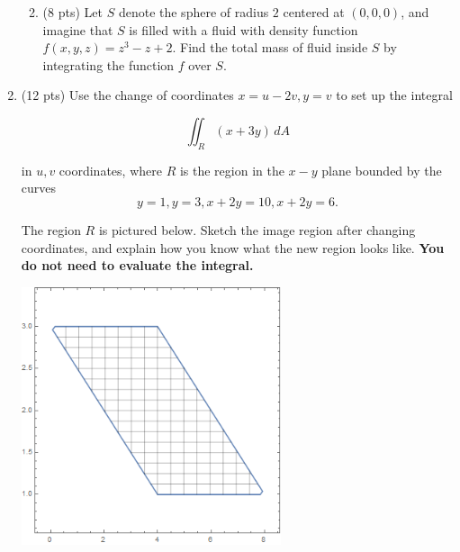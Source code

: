 \documentclass[12 pt]{report}
\begin{document}
\begin{enumerate}
\begin{enumerate}
\vfill

\item (8 pts) Let $S$ denote the sphere of radius $2$ centered at $(0,0,0)$, and imagine that $S$ is filled with a fluid with density function $f(x,y,z) = z^3 - z + 2$. Find the total mass of fluid inside $S$ by integrating the function $f$ over $S$. 

\vfill
\end{enumerate}


\newpage


\item (12 pts) Use the change of coordinates $x = u-2v, y = v$ to set up the integral 

$$\iint_R (x+3y) \, dA$$

in $u,v$ coordinates, where $R$ is the region in the $x-y$ plane bounded by the curves 
$$y=1, y=3, x+2y=10, x+2y=6.$$

The region $R$ is pictured below. Sketch the image region after changing coordinates, and explain how you know what the new region looks like. \textbf{You do not need to evaluate the integral.}

\flushleft \includegraphics[width=3in]{midterm1_problem_3.png}


\end{enumerate}
\end{document}
